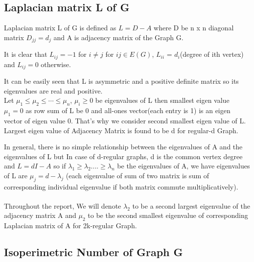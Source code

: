 \documentclass[oneside]{book}
\theoremstyle{definition}
\begin{document}
     
     \subsection{Laplacian matrix L of G }
     
      Laplacian matrix L of G is defined as  $L = D - A$ where  D be n x n diagonal matrix $D_{jj} = d_{j}$ and A is adjacency matrix of the Graph G.\par
      
          
            
          It is clear that   $L_{ij} = -1$ for $i\neq j$  for $ij\in E(G)$,  $L_{ii}$ = $d_i$(degree of ith vertex) and   $L_{ij} = 0$ otherwise.\par
          
          It can be easily seen that L is asymmetric and a positive definite  matrix so its eigenvalues are real and positive. \\
         
          Let $\mu_{1} \leq \mu_{2} \leq \cdots \leq \mu_{n}$, $\mu_{i} \geq 0$  be  eigenvalues of L then smallest eigen value $\mu_{1} = 0$ as row sum of L  be 0 and all-ones vector(each entry is 1) is an eigen vector of eigen value 0. That's why we consider second smallest eigen value of L. Largest eigen value of Adjacency Matrix is found to be d for regular-d Graph. \par
          
          
            
         
In general, there is no simple relationship between the eigenvalues of
A and the eigenvalues of L but In case of d-regular graphs, d is the
common vertex degree and $L = dI - A$  so if $\lambda_{1} \geq \lambda_{2}....\geq \lambda_{n}$  be the eigenvalues of A, we have eigenvalues of L are $\mu_{j} = d - \lambda_{j}$ (each eigenvalue of sum of two matrix is sum of corresponding  individual eigenvalue if both matrix commute multiplicatively). \\\\
Throughout the report, We will denote $\lambda_{2} $ to be a second largest eigenvalue of the adjacency matrix A and $\mu_{2}$ to be the second smallest eigenvalue of corresponding Laplacian matrix of A for 2k-regular Graph.  
          
           
         
           \subsection{Isoperimetric Number of Graph G}
           
\end{document}
